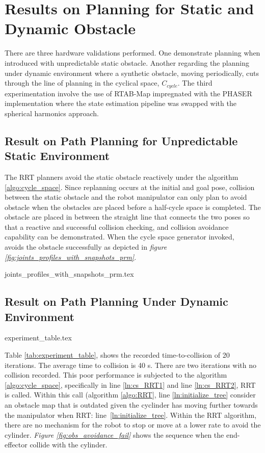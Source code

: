 {\section{Results on Planning for Static and Dynamic Obstacle}

There are three hardware validations performed. One demonstrate planning
when introduced with unpredictable static obstacle. Another regarding the 
planning under dynamic environment where a synthetic obstacle, moving
periodically, cuts through the line of planning
in the cyclical space, $C_{cycle}$. The third experimentation
involve the use of RTAB-Map impregnated with the \acrfull{PHASER} implementation
where the state estimation pipeline was 
swapped with the spherical harmonics approach.

\subsection{Result on Path Planning for Unpredictable Static Environment}

The RRT planners avoid the static obstacle reactively under the algorithm 
\ref{algo:cycle_space}.
Since replanning occurs at the initial and goal pose, collision between
the static obstacle and the robot manipulator can only plan to avoid obstacle
when the obstacles are placed before a half-cycle space is completed. The obstacle
are placed in between the straight line that connects the two poses so that
a reactive and successful collision checking, and collision avoidance 
capability
can be demonstrated. When the cycle space generator invoked, 
\rimini~ avoids the obstacle successfully as depicted in 
\textit{figure \ref{fig:joints_profiles_with_snapshots_prm}}.

{joints_profiles_with_snapshots_prm.tex}

\subsection{Result on Path Planning Under Dynamic Environment}

{experiment_table.tex}

Table \ref{tab:experiment_table}, shows the recorded time-to-collision 
of 20 iterations. The average time to collision is 40 s. 
There are two iterations with no collision recorded. This 
poor performance is subjected to the algorithm \ref{algo:cycle_space},
specifically in line \ref{ln:cs_RRT1} and line \ref{ln:cs_RRT2}, RRT is called.
Within this call (algorithm \ref{algo:RRT}, line \ref{ln:initialize_tree} consider
an obstacle map that is outdated 
given the cyclinder has moving further towards the manipulator when RRT: 
line~\ref{ln:initialize_tree}. 
Within the RRT algorithm, there are no mechanism for the robot to stop or move at 
a lower rate to avoid the cylinder. \textit{Figure \ref{fig:obs_avoidance_fail}} shows
the sequence when the end-effector collide with the cylinder. 

}
